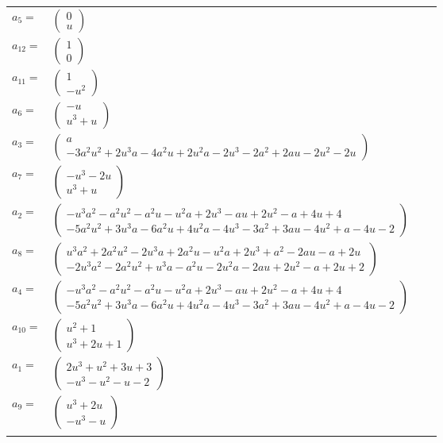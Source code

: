 \documentclass[1p]{elsarticle_modified}
\theoremstyle{definition}
\begin{document}
\begin{tabular}{m{7pt} m{180pt} m{7pt} m{180pt} }
\flushright $a_{5}=$&$\begin{pmatrix}0\\u\end{pmatrix}$ \\
\flushright $a_{12}=$&$\begin{pmatrix}1\\0\end{pmatrix}$ \\
\flushright $a_{11}=$&$\begin{pmatrix}1\\- u^2\end{pmatrix}$ \\
\flushright $a_{6}=$&$\begin{pmatrix}- u\\u^3+u\end{pmatrix}$ \\
\flushright $a_{3}=$&$\begin{pmatrix}a\\-3 a^2 u^2+2 u^3 a-4 a^2 u+2 u^2 a-2 u^3-2 a^2+2 a u-2 u^2-2 u\end{pmatrix}$ \\
\flushright $a_{7}=$&$\begin{pmatrix}- u^3-2 u\\u^3+u\end{pmatrix}$ \\
\flushright $a_{2}=$&$\begin{pmatrix}- u^3 a^2- a^2 u^2- a^2 u- u^2 a+2 u^3- a u+2 u^2- a+4 u+4\\-5 a^2 u^2+3 u^3 a-6 a^2 u+4 u^2 a-4 u^3-3 a^2+3 a u-4 u^2+a-4 u-2\end{pmatrix}$ \\
\flushright $a_{8}=$&$\begin{pmatrix}u^3 a^2+2 a^2 u^2-2 u^3 a+2 a^2 u- u^2 a+2 u^3+a^2-2 a u- a+2 u\\-2 u^3 a^2-2 a^2 u^2+u^3 a- a^2 u-2 u^2 a-2 a u+2 u^2- a+2 u+2\end{pmatrix}$ \\
\flushright $a_{4}=$&$\begin{pmatrix}- u^3 a^2- a^2 u^2- a^2 u- u^2 a+2 u^3- a u+2 u^2- a+4 u+4\\-5 a^2 u^2+3 u^3 a-6 a^2 u+4 u^2 a-4 u^3-3 a^2+3 a u-4 u^2+a-4 u-2\end{pmatrix}$ \\
\flushright $a_{10}=$&$\begin{pmatrix}u^2+1\\u^3+2 u+1\end{pmatrix}$ \\
\flushright $a_{1}=$&$\begin{pmatrix}2 u^3+u^2+3 u+3\\- u^3- u^2- u-2\end{pmatrix}$ \\
\flushright $a_{9}=$&$\begin{pmatrix}u^3+2 u\\- u^3- u\end{pmatrix}$\\&\end{tabular}
\end{document}
